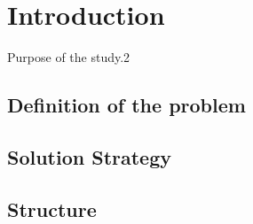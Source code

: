 


\chapter{Introduction} \label{chap1:introduction}
Purpose of the study.2
\section{Definition of the problem} \label{sec1:problem}
\section{Solution Strategy} \label{sec1:solution_strategy}
\section{Structure} \label{sec1:structure}
